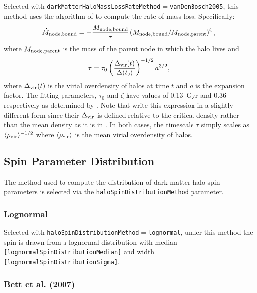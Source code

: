 Selected with {\tt darkMatterHaloMassLossRateMethod}$=${\tt vanDenBosch2005}, this method uses the algorithm of \cite{van_den_bosch_mass_2005} to compute the rate of mass loss. Specifically:
\begin{equation}
\dot{M}_{\rm node,bound} = -{M_{\rm node,bound}\over \tau} \left({M_{\rm node,bound} / M_{\rm node,parent}}\right)^\zeta,
\end{equation}
where $M_{\rm node,parent}$ is the mass of the parent \gls{node} in which the halo lives and
\begin{equation}
\tau = \tau_0 \left({\Delta_{\rm vir}(t) \over \Delta(t_0)}\right)^{-1/2} a^{3/2},
\end{equation}
where $\Delta_{\rm vir}(t)$ is the virial overdensity of halos at time $t$ and $a$ is the expansion factor. The fitting parameters, $\tau_0$ and $\zeta$ have values of 0.13~Gyr and 0.36 respectively as determined by \cite{van_den_bosch_mass_2005}. Note that  \cite{van_den_bosch_mass_2005} write this expression in a slightly different form since their $\Delta_{\rm vir}$ is defined relative to the critical density rather than the mean density as it is in \glc. In both cases, the timescale $\tau$ simply scales as $\langle \rho_{\rm vir} \rangle ^{-1/2}$ where $\langle \rho_{\rm vir} \rangle$ is the mean virial overdensity of halos.

\subsection{Spin Parameter Distribution}\label{sec:SpinParameterDistribution}

The method used to compute the distribution of dark matter halo spin parameters is selected via the {\tt haloSpinDistributionMethod} parameter.

\subsubsection{Lognormal}

Selected with {\tt haloSpinDistributionMethod}$=${\tt lognormal}, under this method the spin is drawn from a lognormal distribution with median {\tt [lognormalSpinDistributionMedian]} and width {\tt [lognormalSpinDistributionSigma]}.

\subsubsection{Bett et al. (2007)}

